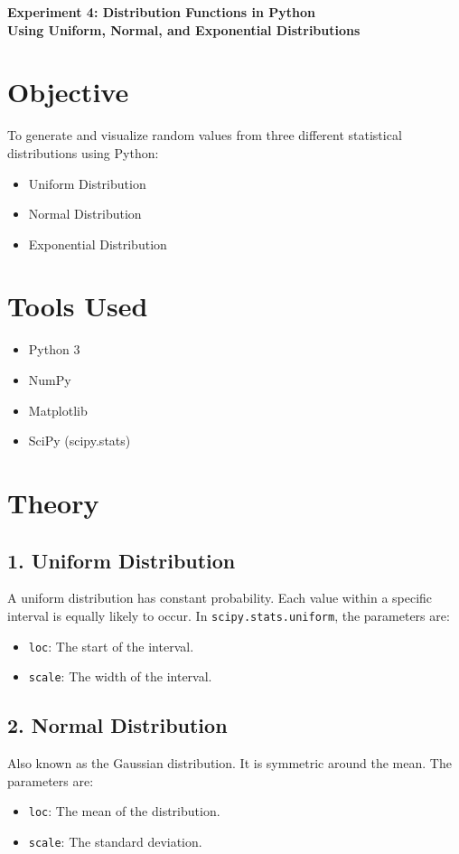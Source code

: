 \documentclass[12pt]{article}
\begin{document}
\begin{center}
    \Large \textbf{Experiment 4: Distribution Functions in Python} \\
    \normalsize \textbf{Using Uniform, Normal, and Exponential Distributions}
\end{center}

\vspace{1em}

\section*{Objective}
To generate and visualize random values from three different statistical distributions using Python:
\begin{itemize}
    \item Uniform Distribution
    \item Normal Distribution
    \item Exponential Distribution
\end{itemize}

\section*{Tools Used}
\begin{itemize}
    \item Python 3
    \item NumPy
    \item Matplotlib
    \item SciPy (scipy.stats)
\end{itemize}

\section*{Theory}
\subsection*{1. Uniform Distribution}
A uniform distribution has constant probability. Each value within a specific interval is equally likely to occur. In \texttt{scipy.stats.uniform}, the parameters are:
\begin{itemize}
    \item \texttt{loc}: The start of the interval.
    \item \texttt{scale}: The width of the interval.
\end{itemize}

\subsection*{2. Normal Distribution}
Also known as the Gaussian distribution. It is symmetric around the mean. The parameters are:
\begin{itemize}
    \item \texttt{loc}: The mean of the distribution.
    \item \texttt{scale}: The standard deviation.
\end{itemize}
\end{document}
